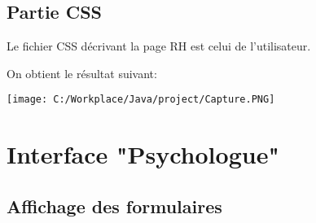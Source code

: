 \documentclass[12]{article}
\begin{document}
\subsection{Partie CSS}
Le fichier CSS décrivant la page RH est celui de l'utilisateur.

On obtient le résultat suivant:

\begin{center}
\texttt{[image: C:/Workplace/Java/project/Capture.PNG]}
\end{center}




\newpage









\section{Interface "Psychologue"}

\subsection{Affichage des formulaires}
\end{document}
